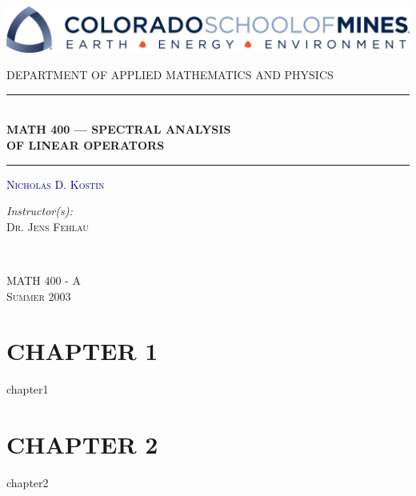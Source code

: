 \documentclass[twoside]{report}
\begin{document}
\begin{titlepage}

\centering

\includegraphics[width=\textwidth]{images/mines.png}

\vspace{2.0em}

\textsc{\large {DEPARTMENT OF APPLIED MATHEMATICS AND PHYSICS}}

\vspace{1.0em}

\rule{\textwidth}{1pt}\\[0.2em]
{\huge {\textbf{MATH 400 --- SPECTRAL ANALYSIS \\[0.2cm] OF LINEAR OPERATORS}}}\\[0.2em]
\rule{\textwidth}{1pt}

\vspace{2.0em}

\textsc{\huge \textcolor{DARKBLUE}{\textsc{Nicholas D. Kostin}}}

\vspace{2.6em}

\begin{minipage}{0.4\textwidth}
\begin{flushleft} \large
\emph{Instructor(s):} \\
\textsc{Dr. Jens Fehlau} \\
\end{flushleft}
\end{minipage}
~
\begin{minipage}{0.4\textwidth}
\begin{flushright} \large
\textsc{MATH 400 - A} \\
\textsc{Summer 2003}
\end{flushright}
\end{minipage}

\vfill

\end{titlepage}

\tableofcontents

\chapter*{CHAPTER 1}
\addtocounter{chapter}{1}
\newpage
{chapter1}

\newpage

\chapter*{CHAPTER 2}
\addtocounter{chapter}{1}
\newpage
{chapter2}
\end{document}
